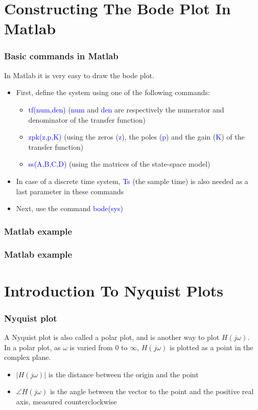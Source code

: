 \section{Constructing The Bode Plot In Matlab}

\begin{frame}
\frametitle{Basic commands in Matlab}

In Matlab it is very easy to draw the bode plot.
\begin{itemize}
\item First, define the system using one of the following commands:
	\begin{itemize}
	\item \textcolor{blue}{tf(num,den)} (\textcolor{blue}{num} and \textcolor{blue}{den} are respectively the numerator and denominator of the transfer function)
	\item \textcolor{blue}{zpk(z,p,K)} (using the zeros (\textcolor{blue}{z}), the poles (\textcolor{blue}{p}) and the gain (\textcolor{blue}{K}) of the transfer function)
	\item \textcolor{blue}{ss(A,B,C,D)} (using the matrices of the state-space model)

	\end{itemize}
\item In case of a discrete time system, \textcolor{blue}{Ts} (the sample time) is also needed as a last parameter in these commands
\item Next, use the command \textcolor{blue}{bode(sys)}

\end{itemize}

\end{frame}

\begin{frame}
\frametitle{Matlab example}

\end{frame}

\begin{frame}
\frametitle{Matlab example}

\end{frame}


\section{Introduction To Nyquist Plots}
\begin{frame}
\frametitle{Nyquist plot}
A Nyquist plot is also called a polar plot, and is another way to plot $H(j\omega)$.\\
In a polar plot, as $\omega$ is varied from 0 to $\infty$, $H(j\omega)$ is plotted as a point in the complex plane.
\begin{itemize}
\item $|H(j\omega)|$ is the distance between the origin and the point
\item $\angle H(j\omega)$ is the angle between the vector to the point and the positive real axis, measured counterclockwise 
\end{itemize}

\end{frame}

